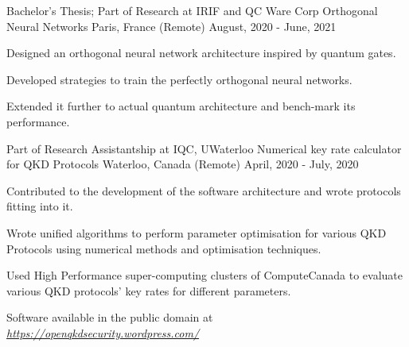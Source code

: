 

\begin{cventries}

  \cventry
    {Bachelor's Thesis; Part of Research at IRIF and QC Ware Corp} %
    {Orthogonal Neural Networks} %
    {Paris, France (Remote)} %
    {August, 2020 - June, 2021} %
    {
      \begin{cvitems} %
        \item {Designed an orthogonal neural network architecture inspired by quantum gates.}
        \item {Developed strategies to train the perfectly orthogonal neural networks.}
        \item {Extended it further to actual quantum architecture and bench-mark its performance.}
      \end{cvitems}
    }


  \cventry
    {Part of Research Assistantship at IQC, UWaterloo} %
    {Numerical key rate calculator for QKD Protocols} %
    {Waterloo, Canada (Remote)} %
    {April, 2020 - July, 2020} %
    {
      \begin{cvitems} %
        \item {Contributed to the development of the software architecture and wrote protocols fitting into it.}
        \item {Wrote unified algorithms to perform parameter optimisation for various QKD Protocols using numerical methods and optimisation techniques.}
        \item {Used High Performance super-computing clusters of ComputeCanada to evaluate various QKD protocols' key rates for different parameters.}
        \item {Software available in the public domain at \emph{\href{https://openqkdsecurity.wordpress.com/}{https://openqkdsecurity.wordpress.com/}}}
      \end{cvitems}
    }
    

\end{cventries}
